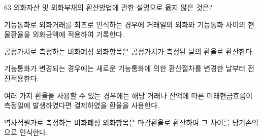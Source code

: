 \begin{question}{63}
외화자산 및 외화부채의 환산방법에 관한 설명으로 옳지 않은 것은?
\begin{choices}
  \item 기능통화로 외화거래를 최초로 인식하는 경우에 거래일의 외화와 기능통화 사이의 현물환율을 외화금액에 적용하여 기록한다.
  \item 공정가치로 측정하는 비화폐성 외화항목은 공정가치가 측정된 날의 환율로 환산한다.
  \item 기능통화가 변경되는 경우에는 새로운 기능통화에 의한 환산절차를 변경한 날부터 전진적용한다.
  \item 여러 가지 환율을 사용할 수 있는 경우에는 해당 거래나 잔액에 따른 미래현금흐름이 측정일에 발생하였다면 결제하였을 환율을 사용한다.
  \item 역사적원가로 측정하는 비화폐성 외화항목은 마감환율로 환산하여 그 차이를 당기손익으로 인식한다.
\end{choices}
\end{question}
